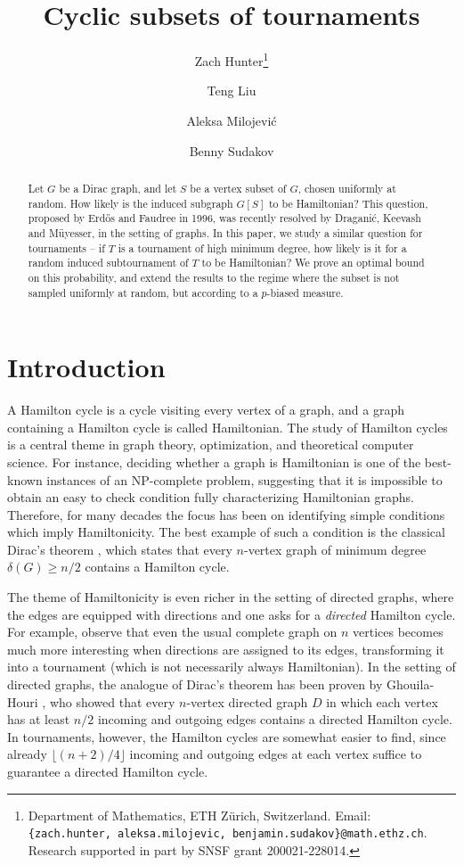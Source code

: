 \documentclass[a4paper,11pt]{article}
\title{\vspace{-0.9cm}Cyclic subsets of tournaments}
\author{
Zach Hunter\thanks{Department of Mathematics, ETH Z\"urich, Switzerland. Email: {\tt \{zach.hunter, aleksa.milojevic, benjamin.sudakov\}@math.ethz.ch}. Research supported in part by SNSF grant 200021-228014.}
\and Teng Liu
\and Aleksa Milojevi\'c\footnotemark[1] \and Benny Sudakov\footnotemark[1]
}
\date{}
\theoremstyle{definition}
\begin{document}
\maketitle

\begin{abstract}
Let $G$ be a Dirac graph, and let $S$ be a vertex subset of $G$, chosen uniformly at random. How likely is the induced subgraph $G[S]$ to be Hamiltonian? This question, proposed by Erd\H{o}s and Faudree in 1996, was recently resolved by Dragani\'c, Keevash and M\"uyesser, in the setting of graphs. In this paper, we study a similar question for tournaments -- if $T$ is a tournament of high minimum degree, how likely is it for a random induced subtournament of $T$ to be Hamiltonian? We prove an optimal bound on this probability, and extend the results to the regime where the subset is not sampled uniformly at random, but according to a $p$-biased measure.
\end{abstract}

\section{Introduction}

A Hamilton cycle is a cycle visiting every vertex of a graph, and a graph containing a Hamilton cycle is called Hamiltonian. The study of Hamilton cycles is a central theme in graph theory, optimization, and theoretical computer science. For instance, deciding whether a graph is Hamiltonian is one of the best-known instances of an NP-complete problem, suggesting that it is impossible to obtain an easy to check condition fully characterizing Hamiltonian graphs. Therefore, for many decades the focus has been on identifying simple conditions which imply Hamiltonicity. The best example of such a condition is the classical Dirac's theorem \cite{D}, which states that every $n$-vertex graph of minimum degree $\delta(G)\geq n/2$ contains a Hamilton cycle. 

The theme of Hamiltonicity is even richer in the setting of directed graphs, where the edges are equipped with directions and one asks for a \textit{directed} Hamilton cycle. For example, observe that even the usual complete graph on $n$ vertices becomes much more interesting when directions are assigned to its edges, transforming it into a tournament (which is not necessarily always Hamiltonian). In the setting of directed graphs, the analogue of Dirac's theorem has been proven by Ghouila-Houri \cite{GH}, who showed that every $n$-vertex directed graph $D$ in which each vertex has at least $n/2$ incoming and outgoing edges contains a directed Hamilton cycle. In tournaments, however, the Hamilton cycles are somewhat easier to find, since already $\lfloor (n+2)/4\rfloor$ incoming and outgoing edges at each vertex suffice to guarantee a directed Hamilton cycle.
\end{document}

